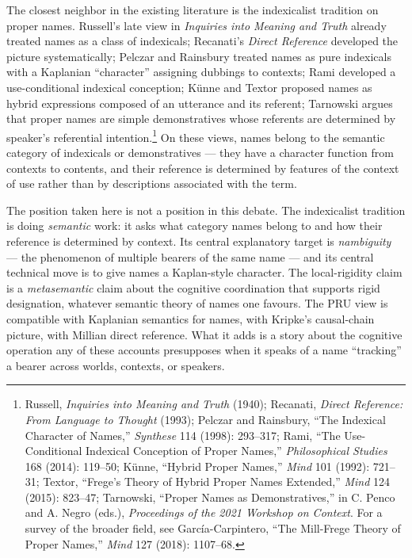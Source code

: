 \documentclass[12pt,a4paper]{article}
\begin{document}
The closest neighbor in the existing literature is the indexicalist tradition on proper names. Russell's late view in \emph{Inquiries into Meaning and Truth} already treated names as a class of indexicals; Recanati's \emph{Direct Reference} developed the picture systematically; Pelczar and Rainsbury treated names as pure indexicals with a Kaplanian ``character'' assigning dubbings to contexts; Rami developed a use-conditional indexical conception; Künne and Textor proposed names as hybrid expressions composed of an utterance and its referent; Tarnowski argues that proper names are simple demonstratives whose referents are determined by speaker's referential intention.\footnote{Russell, \emph{Inquiries into Meaning and Truth} (1940); Recanati, \emph{Direct Reference: From Language to Thought} (1993); Pelczar and Rainsbury, ``The Indexical Character of Names,'' \emph{Synthese} 114 (1998): 293--317; Rami, ``The Use-Conditional Indexical Conception of Proper Names,'' \emph{Philosophical Studies} 168 (2014): 119--50; Künne, ``Hybrid Proper Names,'' \emph{Mind} 101 (1992): 721--31; Textor, ``Frege's Theory of Hybrid Proper Names Extended,'' \emph{Mind} 124 (2015): 823--47; Tarnowski, ``Proper Names as Demonstratives,'' in C. Penco and A. Negro (eds.), \emph{Proceedings of the 2021 Workshop on Context}. For a survey of the broader field, see García-Carpintero, ``The Mill-Frege Theory of Proper Names,'' \emph{Mind} 127 (2018): 1107--68.} On these views, names belong to the semantic category of indexicals or demonstratives --- they have a character function from contexts to contents, and their reference is determined by features of the context of use rather than by descriptions associated with the term.

The position taken here is not a position in this debate. The indexicalist tradition is doing \emph{semantic} work: it asks what category names belong to and how their reference is determined by context. Its central explanatory target is \emph{nambiguity} --- the phenomenon of multiple bearers of the same name --- and its central technical move is to give names a Kaplan-style character. The local-rigidity claim is a \emph{metasemantic} claim about the cognitive coordination that supports rigid designation, whatever semantic theory of names one favours. The PRU view is compatible with Kaplanian semantics for names, with Kripke's causal-chain picture, with Millian direct reference. What it adds is a story about the cognitive operation any of these accounts presupposes when it speaks of a name ``tracking'' a bearer across worlds, contexts, or speakers.
\end{document}
